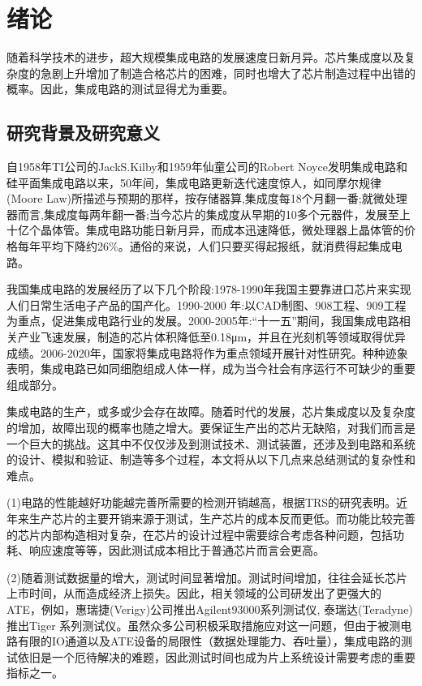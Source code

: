 
\chapter{绪论}

随着科学技术的进步，超大规模集成电路的发展速度日新月异。芯片集成度以及复杂度的急剧上升增加了制造合格芯片的困难，同时也增大了芯片制造过程中出错的概率。因此，集成电路的测试显得尤为重要。

\section{研究背景及研究意义}

自1958年TI公司的JackS.Kilby和1959年仙童公司的Robert Noyce发明集成电路和硅平面集成电路以来，50年间，集成电路更新迭代速度惊人，如同摩尔规律(Moore Law)所描述与预期的那样，按存储器算,集成度每18个月翻一番;就微处理器而言,集成度每两年翻一番;当今芯片的集成度从早期的10多个元器件，发展至上十亿个晶体管。集成电路功能日新月异，而成本迅速降低，微处理器上晶体管的价格每年平均下降约26\%。通俗的来说，人们只要买得起报纸，就消费得起集成电路。

我国集成电路的发展经历了以下几个阶段\cite{1}:1978-1990年我国主要靠进口芯片来实现人们日常生活电子产品的国产化。1990-2000 年:以CAD制图、908工程、909工程为重点，促进集成电路行业的发展。2000-2005年:“十一五”期间，我国集成电路相关产业飞速发展，制造的芯片体积降低至0.18μm\cite{2}，并且在光刻机等领域取得优异成绩\cite{3}。2006-2020年，国家将集成电路将作为重点领域开展针对性研究。种种迹象表明，集成电路已如同细胞组成人体一样，成为当今社会有序运行不可缺少的重要组成部分。

集成电路的生产，或多或少会存在故障。随着时代的发展，芯片集成度以及复杂度的增加，故障出现的概率也随之增大。要保证生产出的芯片无缺陷，对我们而言是一个巨大的挑战。这其中不仅仅涉及到测试技术、测试装置，还涉及到电路和系统的设计、模拟和验证、制造等多个过程，本文将从以下几点来总结测试的复杂性和难点。

(1)电路的性能越好功能越完善所需要的检测开销越高，根据TRS的研究表明\cite{4}。近年来生产芯片的主要开销来源于测试，生产芯片的成本反而更低。而功能比较完善的芯片内部构造相对复杂，在芯片的设计过程中需要综合考虑各种问题，包括功耗、响应速度等等，因此测试成本相比于普通芯片而言会更高。

(2)随着测试数据量的增大，测试时间显著增加\cite{5}。测试时间增加，往往会延长芯片上市时间，从而造成经济上损失。因此，相关领域的公司研发出了更强大的ATE，例如，惠瑞捷(Verigy)公司推出Agilent93000系列测试仪\cite{6}, 泰瑞达(Teradyne) 推出Tiger 系列测试仪\cite{7}。虽然众多公司积极采取措施应对这一问题，但由于被测电路有限的IO通道以及ATE设备的局限性（数据处理能力、吞吐量），集成电路的测试依旧是一个厄待解决的难题\cite{8,9}，因此测试时间也成为片上系统设计需要考虑的重要指标之一\cite{10}。

